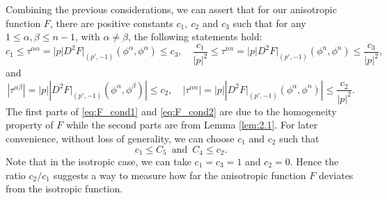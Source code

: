 \documentclass[12pt]{article}
\numberwithin{equation}{section}
\theoremstyle{plain}
\theoremstyle{definition}
\theoremstyle{remark}
\begin{document}
Combining the previous considerations, we can assert that for our anisotropic function $F$, 
there are positive constants $c_1,\ c_2$ and $c_3$ such that for any $1\leq \alpha,\beta \leq n-1$, with $\alpha\neq\beta$, the following statements hold:
\begin{equation} \label{eq:F_cond1}
     c_1 \leq\tau^{\alpha \alpha} =  |p| D^2 F\Big|_{(p',-1)} (\phi^{\alpha}, \phi^{\alpha}) \leq c_3 , \quad \frac{c_1}{|p|^2} \leq \tau^{n n} = |p| D^2 F\Big|_{(p',-1)} (\phi^n, \phi^n) \leq \frac{c_3}{|p|^2} ,
\end{equation}
and 
\begin{equation} \label{eq:F_cond2}
    |\tau^{\alpha \beta}| = |p|\left|D^2 F\Big|_{(p',-1)} (\phi^{\alpha}, \phi^{\beta})\right| \leq c_2, \quad 
    |\tau^{\alpha n}| = |p|\left| D^2 F\Big|_{(p',-1)} (\phi^\alpha, \phi^n)\right|\leq \frac{c_2}{|p|^2}.
\end{equation}
The first parts of \eqref{eq:F_cond1} and \eqref{eq:F_cond2} are due to the homogeneity property of $F$ while the second parts are from Lemma \ref{lem:2.1}. For later convenience, without loss of generality, we can choose $c_1$ and $c_2$ such that
\begin{equation} \label{eq:F_cond3}
   c_1 \leq C_5 \,\,\,\text{and}\,\, \, C_4 \leq c_2.
\end{equation}
Note that in the isotropic case, we can take $c_1 =c_3 = 1$ and $c_2 = 0$. 
Hence the ratio $c_2/c_1$ suggests a way to measure how far the anisotropic function $F$ deviates from the isotropic function.
\end{document}
